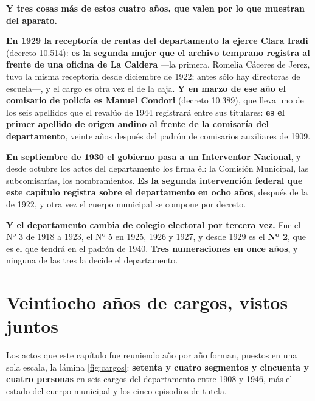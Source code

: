 \begin{cautela}
\textbf{Y tres cosas más de estos cuatro años, que valen por lo que muestran del aparato.}

\textbf{En 1929 la receptoría de rentas del departamento la ejerce Clara Iradi} (decreto 10.514):
\textbf{es la segunda mujer que el archivo temprano registra al frente de una oficina de La Caldera}
---la primera, Romelia Cáceres de Jerez, tuvo la misma receptoría desde diciembre de 1922; antes sólo hay directoras de escuela---, y el
cargo es otra vez el de la caja. \textbf{Y en marzo de ese año el comisario de policía es Manuel
Condori} (decreto 10.389), que lleva uno de los seis apellidos que el revalúo de 1944 registrará
entre sus titulares: \textbf{es el primer apellido de origen andino al frente de la comisaría del
departamento}, veinte años después del padrón de comisarios auxiliares de 1909.

\textbf{En septiembre de 1930 el gobierno pasa a un Interventor Nacional}, y desde octubre los
actos del departamento los firma él: la Comisión Municipal, las subcomisarías, los nombramientos.
\textbf{Es la segunda intervención federal que este capítulo registra sobre el departamento en
ocho años}, después de la de 1922, y otra vez el cuerpo municipal se compone por decreto.

\textbf{Y el departamento cambia de colegio electoral por tercera vez.} Fue el Nº 3 de 1918 a
1923, el Nº 5 en 1925, 1926 y 1927, y desde 1929 es el \textbf{Nº 2}, que es el que tendrá en el
padrón de 1940. \textbf{Tres numeraciones en once años}, y ninguna de las tres la decide el
departamento.
\end{cautela}

\section{Veintiocho años de cargos, vistos juntos}

Los actos que este capítulo fue reuniendo año por año forman, puestos en una sola escala, la
lámina \ref{fig:cargos}: \textbf{setenta y cuatro segmentos y cincuenta y cuatro personas} en seis cargos del departamento entre
1908 y 1946, más el estado del cuerpo municipal y los cinco episodios de tutela.

